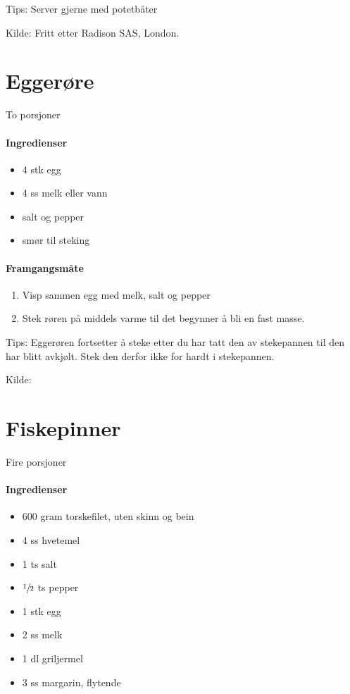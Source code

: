 \documentclass[12pt,a4paper]{book}
\begin{document}
Tips:
Server gjerne med potetbåter

Kilde: Fritt etter Radison SAS, London.
\clearpage{}
\clearpage{}\section{﻿Eggerøre}
To porsjoner

\paragraph{Ingredienser}
\begin{itemize}[noitemsep]
	\item 4 stk egg
	\item 4 ss melk eller vann
	\item salt og pepper
	\item smør til steking
\end{itemize}

\paragraph{Framgangsmåte}
\begin{enumerate}[noitemsep]
	\item Visp sammen egg med melk, salt og pepper
	\item Stek røren på middels varme til det begynner å bli en fast masse.
\end{enumerate}

Tips: Eggerøren fortsetter å steke etter du har tatt den av stekepannen til den har blitt avkjølt. Stek den derfor ikke for hardt i stekepannen.

Kilde: \href{http://www.matprat.no/sunn/sunne-oppskrifter/sunne-oppskrifter-god-samvittighet/eggerore/}{}
\clearpage{}
\clearpage{}\section{﻿Fiskepinner}
Fire porsjoner

\paragraph{Ingredienser}
\begin{itemize}[noitemsep]
	\item 600 gram  torskefilet, uten skinn og bein
	\item 4 ss hvetemel
	\item 1 ts salt
	\item $\sfrac{1}{2}$  ts pepper
	\item 1 stk egg
	\item 2 ss melk
	\item 1 dl griljermel
	\item 3 ss margarin, flytende
\end{itemize}
\end{document}
